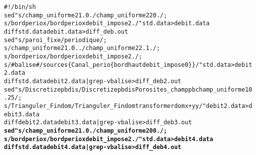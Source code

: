 \begin{alltt}
#!/bin/sh
sed "s/champ_uniforme 2 1. 0./ champ_uniforme 2 2 0./;
    s/bord periox/ bord periox debit_impose 2./" std.data >  debit.data
diff std.data debit.data > diff_deb.out
sed "s/paroi_fixe/periodique/;
    s/champ_uniforme 2 1. 0../ champ_uniforme 2 2. 1./;
    s/bord periox/ bord periox debit_impose 2./;
    s/# balise #/sources \{ Canal_perio \{  bord haut debit_impose 0 \} \}/" std.data > debit2.data
diff std.data debit2.data | grep -v balise > diff_deb2.out
sed "s/Discretize pb dis/Discretize pb dis Porosites_champ pb champ_uniforme 1 0.25/;
    s/Trianguler_Fin dom/Trianguler_Fin dom transformer dom x+y y/" debit2.data > debit3.data 
diff debit2.data debit3.data | grep -v balise > diff_deb3.out
{\bf{sed "s/champ_uniforme 2 1. 0./ champ_uniforme 2 0 0./;
    s/bord periox/ bord periox debit_impose 2./" std.data >  debit4.data
diff std.data debit4.data  | grep -v balise > diff_deb4.out }}
\end{alltt}
